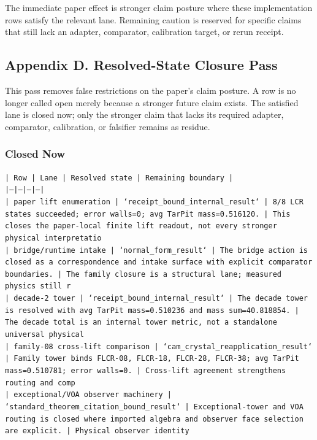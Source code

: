 \documentclass[11pt]{article}
\begin{document}
The immediate paper effect is stronger claim posture where these implementation rows satisfy the relevant lane. Remaining caution is reserved for specific claims that still lack an adapter, comparator, calibration target, or rerun receipt.

\subsection*{Appendix D. Resolved-State Closure Pass}

This pass removes false restrictions on the paper's claim posture. A row is no longer called open merely because a stronger future claim exists. The satisfied lane is closed now; only the stronger claim that lacks its required adapter, comparator, calibration, or falsifier remains as residue.

\subsubsection*{Closed Now}

\noindent\texttt{| Row | Lane | Resolved state | Remaining boundary |}\\
\noindent\texttt{|---|---|---|---|}\\
\noindent\texttt{| paper lift enumeration | `receipt\_bound\_internal\_result` | 8/8 LCR states succeeded; error walls=0; avg TarPit mass=0.516120. | This closes the paper-local finite lift readout, not every stronger physical interpretatio}\\
\noindent\texttt{| bridge/runtime intake | `normal\_form\_result` | The bridge action is closed as a correspondence and intake surface with explicit comparator boundaries. | The family closure is a structural lane; measured physics still r}\\
\noindent\texttt{| decade-2 tower | `receipt\_bound\_internal\_result` | The decade tower is resolved with avg TarPit mass=0.510236 and mass sum=40.818854. | The decade total is an internal tower metric, not a standalone universal physical }\\
\noindent\texttt{| family-08 cross-lift comparison | `cam\_crystal\_reapplication\_result` | Family tower binds FLCR-08, FLCR-18, FLCR-28, FLCR-38; avg TarPit mass=0.510781; error walls=0. | Cross-lift agreement strengthens routing and comp}\\
\noindent\texttt{| exceptional/VOA observer machinery | `standard\_theorem\_citation\_bound\_result` | Exceptional-tower and VOA routing is closed where imported algebra and observer face selection are explicit. | Physical observer identity }\\
\end{document}
